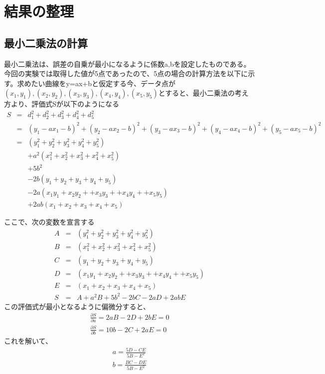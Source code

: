 \documentclass[a4j,twoside,openright,11pt]{jarticle}
\begin{document}
\section{結果の整理}
\subsection{最小二乗法の計算}
最小二乗法は、誤差の自乗が最小になるように係数a,bを設定したものである。今回の実験では取得した値が5点であったので、5点の場合の計算方法を以下に示す。求めたい曲線をy=ax+bと仮定する今、データ点が$(x_1,y_1),(x_2,y_2),(x_3,y_3),(x_4,y_4),(x_5,y_5)$とすると、最小二乗法の考え方より、評価式Sが以下のようになる
\begin{eqnarray}
S &=& d_1^2 + d_2^2 + d_3^2 + d_4^2 + d_5^2 \nonumber\\
&=& (y_1-ax_1-b)^2 + (y_2-ax_2-b)^2 + (y_3-ax_3-b)^2 + (y_4-ax_4-b)^2 + (y_5-ax_5-b)^2\nonumber \\
&=&(y_1^2 + y_2^2 + y_3^2 + y_4^2 + y_5^2)\nonumber\\
&& +a^2(x_1^2 + x_2^2 + x_3^2 + x_4^2 + x_5^2)\nonumber\\
&& +5b^2\nonumber\\
&&- 2b(y_1 + y_2 + y_3 + y_4 + y_5)\nonumber\\
&& -2a(x_1y_1 + x_2y_2 + + x_3y_3 + + x_4y_4 + + x_5y_5) \nonumber\\
&&+ 2ab(x_1 + x_2 + x_3 + x_4 + x_5)
\end{eqnarray}

ここで、次の変数を宣言する
\begin{eqnarray}
A&=&(y_1^2 + y_2^2 + y_3^2 + y_4^2 + y_5^2)\nonumber\\
B&=&(x_1^2 + x_2^2 + x_3^2 + x_4^2 + x_5^2)\nonumber\\
C&=&(y_1 + y_2 + y_3 + y_4 + y_5)\nonumber\\
D&=&(x_1y_1 + x_2y_2 + + x_3y_3 + + x_4y_4 + + x_5y_5) \nonumber\\
E&=&(x_1 + x_2 + x_3 + x_4 + x_5)\nonumber\\
S&=&A+a^2B+5b^2-2bC-2aD+2abE
\end{eqnarray}
この評価式が最小となるように偏微分すると、
\begin{eqnarray}
\frac{\partial S}{\partial a} = 2aB-2D+2bE = 0\nonumber\\
\frac{\partial S}{\partial b} = 10b-2C+2aE  = 0\nonumber
\end{eqnarray}
これを解いて、
\begin{eqnarray}
a=\frac{5D-CE}{5B-E^2}\nonumber\\
b=\frac{BC-DE}{5B-E^2}
\end{eqnarray}
\end{document}
